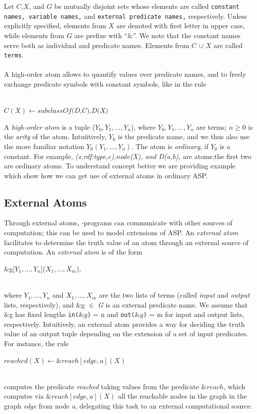 \documentclass[14pt,a4paper, titlepage]{article}
\begin{document}
Let $C$,$X$, and $G$ be mutually disjoint sets whose elements are called \texttt{constant names, variable names,} and \texttt{external predicate names,} respectively. Unless explicitly specified, elements from \texttt{$X$} are denoted with first letter in upper case, while elements from \texttt{$G$} are prefixe with \enquote{\&}. 
We note that the constant names serve both as individual and predicate names. Elements from \texttt{$C$} $\cup$ \texttt{$X$} are called \texttt{terms}. \\ \\A high-order atom allows to quantify values over predicate names, and to freely exchange predicate symbols with constant symbols, like in the rule\\ \centerline{\\$C(X) \leftarrow \textit{subclassOf(D,C),D(X)}$}
A \textit{high-order atom} is a tuple ($Y_0, Y_1,\dots,Y_n$), where $Y_0, Y_1,\dots,Y_n$ are terms; $ n \ge 0$ is the \textit{arity} of the atom. Intuiitively, $Y_0$ is the predicate name, and we thus also use the more familiar notation $Y_0(Y_1,\dots,Y_n)$. The atom is \textit{ordinary}, if $Y_0$ is a constant. For example, \textit{(x,rdf:type,c),node(X), and D(a,b),} are atoms;the first two are ordinary atoms. To understand concept better we are providing example which show how we can get use of external atoms in ordinary ASP.

\subsection{External Atoms}
Through external atoms, \hex{}-programs can communicate with other sources of computation; this can be used to model extensions of ASP.  
An \emph{external atom} facilitates to determine the truth value of an atom through an external source of computation.
An \emph{external atom} is of the form \\ \centerline{ \&g[$Y_1,\dots,Y_n$]($X_1,\dots,X_m$),} \\where $Y_1,\dots,Y_n$ and $X_1,\dots,X_m$ are the two lists of terms (called \textit{input} and \textit{output} lists, respectively), and \&g $\in$ \textit{G} is an external predicate name. We assume that \&g has fixed lengths \texttt{in($\&g$)} = n and \texttt{out($\&g$)} = m for input and output lists, respectively. Intuitively, an external atom provides a way for deciding the truth value of an output tuple depending on the extension of a set of input predicates.
For instance, the rule \\ \centerline{ \textit{$reached(X) \leftarrow \&reach[edge,a](X)$}}
\\computes the predicate \textit{reached} taking values from the predicate $\&reach$, which computes via \textit{$\&reach[edge,a](X)$} all the reachable nodes in the graph in the graph \textit{edge} from node \textit{a}, delegating this task to an external computational source.
\end{document}
